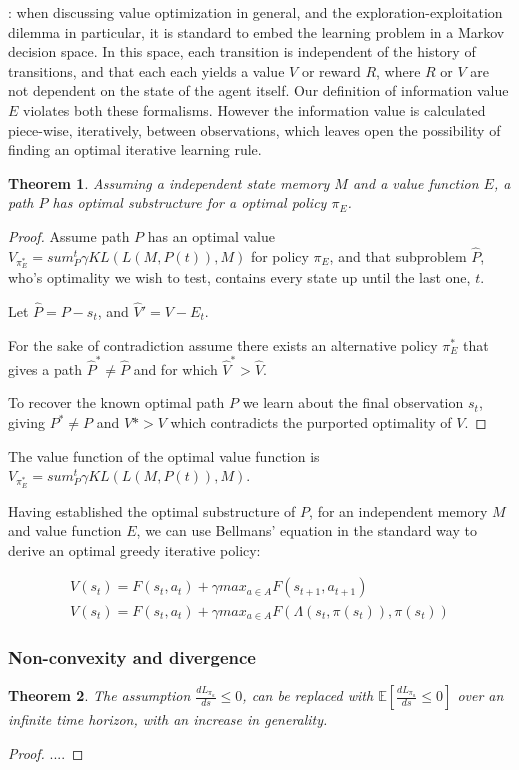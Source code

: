 \documentclass[9pt,twocolumn,twoside]{pnas-new}
\newtheorem{theorem}{Theorem}[section]
\begin{document}
: when discussing value optimization in general, and the exploration-exploitation dilemma in particular, it is standard to embed the learning problem in a Markov decision space. In this space, each transition is independent of the history of transitions, and that each each yields a value $V$ or reward $R$, where $R$ or $V$ are not dependent on the state of the agent itself. Our definition of information value $E$ violates both these formalisms. However the information value is calculated piece-wise, iteratively, between observations, which leaves open the possibility of finding an optimal iterative learning rule. 

\begin{theorem}
    Assuming a independent state memory $M$ and a value function $E$, a path $P$ has optimal substructure for a optimal policy $\pi_E$.
\end{theorem}
\begin{proof}
    Assume path $P$ has an optimal value $V_{\pi_E^*} = sum^t_P \gamma KL(L(M, P(t)), M)$ for policy $\pi_E$, and that subproblem $\hat P$, who's optimality we wish to test, contains every state up until the last one, $t$. 
    
    Let $\hat P = P - s_t$, and $\hat V' = V - E_t$.

    For the sake of contradiction assume there exists an alternative policy $\pi_E^*$ that gives a path $\hat P^* \neq \hat P$ and for which $\hat V^* > \hat V$. 

    To recover the known optimal path $P$ we learn about the final observation $s_t$, giving $P^* \neq P$ and $V* > V$ which contradicts the purported optimality of $V$.
\end{proof}

The value function of the optimal value function is $V_{\pi_E^*} = sum^t_P \gamma KL(L(M, P(t)), M)$. 

Having established the optimal substructure of $P$, for an independent memory $M$ and value function $E$, we can use Bellmans' equation in the standard way to derive an optimal greedy iterative policy:

\begin{align}
    V(s_t) = F(s_t, a_t) + \gamma max_{a \in A} F(s_{t+1}, a_{t+1}) \\
    V(s_t) = F(s_t, a_t) + \gamma max_{a \in A} F(\Lambda(s_t, \pi(s_t)), \pi(s_t))
\end{align}

\subsubsection*{Non-convexity and divergence}
\begin{theorem}
    The assumption $\frac{dL_{\pi_{a}}}{ds} \leq 0$, can be replaced with $\mathbb{E} [\frac{dL_{\pi_{a}}}{ds} \leq 0]$ over an infinite time horizon, with an increase in generality.
\end{theorem}
\begin{proof}
....
\end{proof}
\end{document}

